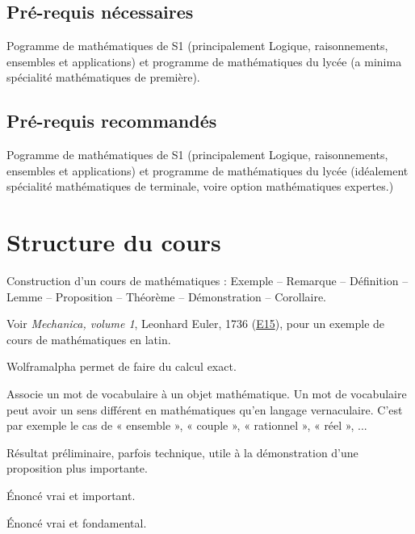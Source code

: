 \subsection*{Pré-requis nécessaires}

Pogramme de mathématiques de S1 (principalement Logique, raisonnements, ensembles et applications) et programme de mathématiques du lycée (a minima spécialité mathématiques de première).

\subsection*{Pré-requis recommandés}

Pogramme de mathématiques de S1 (principalement Logique, raisonnements, ensembles et applications) et programme de mathématiques du lycée (idéalement spécialité mathématiques de terminale, voire option mathématiques expertes.)

\section*{Structure du cours}

Construction d'un cours de mathématiques : Exemple -- Remarque -- Définition -- Lemme -- Proposition -- Théorème -- Démonstration -- Corollaire.

Voir \emph{Mechanica, volume 1}, Leonhard Euler, 1736 (\href{https://scholarlycommons.pacific.edu/euler-works/15/}{E15}), pour un exemple de cours de mathématiques en latin.

Wolframalpha permet de faire du calcul exact.

\begin{definition*}
Associe un mot de vocabulaire à un objet mathématique.
Un mot de vocabulaire peut avoir un sens différent en mathématiques qu'en langage vernaculaire.
C'est par exemple le cas de « ensemble », « couple », « rationnel », « réel », ...
\end{definition*}

\begin{lemme*}
	Résultat préliminaire, parfois technique, utile à la démonstration d'une proposition plus importante.
\end{lemme*}

\begin{proposition*}
	Énoncé vrai et important.
\end{proposition*}

\begin{theorem*}
	Énoncé vrai et fondamental.
\end{theorem*}

